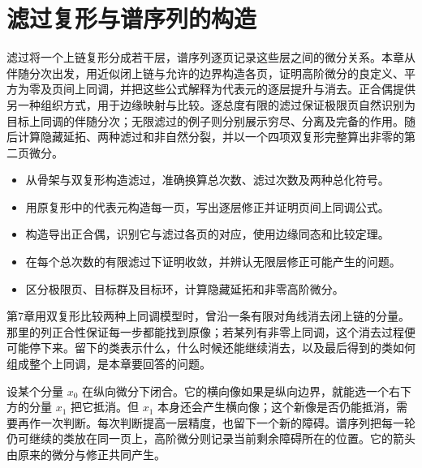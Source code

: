 
% 
% 

\chapter{滤过复形与谱序列的构造}
\label{g2:ch:10}

\begin{chapterabstract}
	滤过将一个上链复形分成若干层，谱序列逐页记录这些层之间的微分关系。本章从伴随分次出发，用近似闭上链与允许的边界构造各页，证明高阶微分的良定义、平方为零及页间上同调，并把这些公式解释为代表元的逐层提升与消去。正合偶提供另一种组织方式，用于边缘映射与比较。逐总度有限的滤过保证极限页自然识别为目标上同调的伴随分次；无限滤过的例子则分别展示穷尽、分离及完备的作用。随后计算隐藏延拓、两种滤过和非自然分裂，并以一个四项双复形完整算出非零的第二页微分。
\end{chapterabstract}

\begin{learninggoals}
	\begin{itemize}
		\item 从骨架与双复形构造滤过，准确换算总次数、滤过次数及两种总化符号。
		\item 用原复形中的代表元构造每一页，写出逐层修正并证明页间上同调公式。
		\item 构造导出正合偶，识别它与滤过各页的对应，使用边缘同态和比较定理。
		\item 在每个总次数的有限滤过下证明收敛，并辨认无限层修正可能产生的问题。
		\item 区分极限页、目标群及目标环，计算隐藏延拓和非零高阶微分。
	\end{itemize}
\end{learninggoals}

第7章用双复形比较两种上同调模型时，曾沿一条有限对角线消去闭上链的分量。那里的列正合性保证每一步都能找到原像；若某列有非零上同调，这个消去过程便可能停下来。留下的类表示什么，什么时候还能继续消去，以及最后得到的类如何组成整个上同调，是本章要回答的问题。

\ProseParagraphBreak

设某个分量 \(x_0\) 在纵向微分下闭合。它的横向像如果是纵向边界，就能选一个右下方的分量 \(x_1\) 把它抵消。但 \(x_1\) 本身还会产生横向像；这个新像是否仍能抵消，需要再作一次判断。每次判断提高一层精度，也留下一个新的障碍。谱序列把每一轮仍可继续的类放在同一页上，高阶微分则记录当前剩余障碍所在的位置。它的箭头由原来的微分与修正共同产生。


